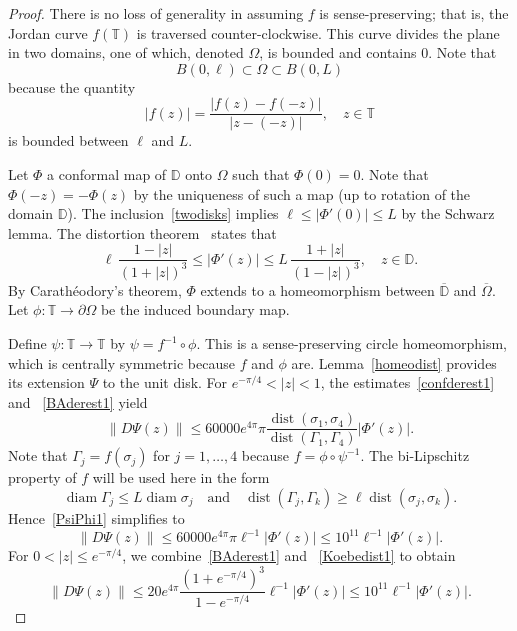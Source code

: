 \documentclass[11pt]{amsart}
\theoremstyle{remark}
\numberwithin{equation}{section}
\newcommand{\DD}{\mathbb{D}}
\newcommand{\T}{\mathbb{T}}
\newcommand{\abs}[1]{\lvert#1\rvert}
\newcommand{\norm}[1]{\lVert#1\rVert}
\DeclareMathOperator{\dist}{dist}
\DeclareMathOperator{\diam}{diam}
\begin{document}
\begin{proof} There is no loss of generality in assuming $f$ is sense-preserving; that is, the Jordan curve $f(\T)$ is traversed counter-clockwise. This curve divides the plane in two domains, one of which, denoted $\Omega$, is bounded and contains $0$. Note that 
\begin{equation}\label{twodisks}
B(0, \ell)\subset  \Omega \subset B(0,L)
\end{equation}
because the quantity 
\[
\abs{f(z)} = \frac{\abs{f(z)-f(-z)}}{\abs{z-(-z)}},\quad z\in\T 
\]
is bounded between $\ell$ and $L$. 

Let $\Phi$ a conformal map of $\DD$ onto $\Omega$ such that $\Phi(0)=0$. Note that $\Phi(-z)=-\Phi(z)$ by the uniqueness of such a map (up to rotation of the domain $\DD$). The inclusion~\eqref{twodisks} implies $\ell \le \abs{\Phi'(0)} \le L$ by the Schwarz lemma. The distortion theorem~\cite[Theorem 2.5]{Durb} states that
\begin{equation}\label{Koebedist1}
\ell\,\frac{1-\abs{z}}{(1+\abs{z})^3}  \le \abs{\Phi'(z)} \le L\,\frac{1+\abs{z}}{(1-\abs{z})^3}, \quad z\in\DD.
\end{equation}
By Carath\'eodory's theorem, $\Phi$ extends to a homeomorphism between $\overline{\DD}$ and $\overline{\Omega}$. Let $\phi\colon \T \to \partial\Omega $ be the induced boundary map. 

Define $\psi\colon \T\to\T$ by $\psi = f^{-1}\circ \phi$. This is a  sense-preserving circle homeomorphism, which is centrally symmetric because $f$ and $\phi$ are. Lemma~\ref{homeodist} provides its extension $\Psi$ to the unit disk. For $e^{-\pi/4}<\abs{z}<1$, the estimates~\eqref{confderest1}  and ~\eqref{BAderest1} yield 
\begin{equation}\label{PsiPhi1}
\norm{D\Psi(z)} \le 60000 e^{4\pi} \pi \frac{\dist(\sigma_1,\sigma_4)}{\dist(\Gamma_1, \Gamma_4)} \abs{\Phi'(z)}. 
\end{equation}
Note that $\Gamma_j = f(\sigma_j)$ for $j=1,\dots,4$ because $f= \phi\circ \psi^{-1}$. 
The bi-Lipschitz property of $f$ will be used here in the form
\begin{equation}\label{BLpropused}
\diam \Gamma_j \le L\diam \sigma_j \quad \text{and} \quad \dist(\Gamma_j, \Gamma_k) \ge \ell \dist(\sigma_j, \sigma_k). 
\end{equation}
Hence~\eqref{PsiPhi1} simplifies to 
\begin{equation}\label{PsiPhi2}
\norm{D\Psi(z)} \le 60000 e^{4\pi} \pi \ell^{-1} \abs{\Phi'(z)} \le 10^{11}\ell^{-1} \abs{\Phi'(z)}. 
\end{equation}
For $0<\abs{z}\le e^{-\pi/4}$, we combine~\eqref{BAderest1} and  ~\eqref{Koebedist1} to obtain
\begin{equation}\label{PsiPhi3}
\norm{D\Psi(z)} \le 20 e^{4\pi} \frac{(1+e^{-\pi/4})^3}{1-e^{-\pi/4}}\ell^{-1} \abs{\Phi'(z)} 
\le   10^{11}\ell^{-1} \abs{\Phi'(z)}. 
\end{equation}


\end{proof}
\end{document}
